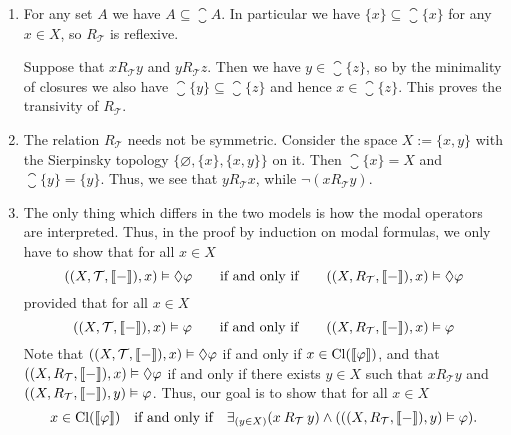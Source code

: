 \documentclass{article}
\newcommand{\topology}{{\mathcal{T}}}
\begin{document}
\maketitle

\begin{ex}
\end{ex}

\begin{ex}
\begin{enumerate}
\item For any set $A$ we have $A\subseteq\closure{A}$. In particular we have
$\{x\}\subseteq\closure{\{x\}}$ for any $x\in X$, so $R_\topology$ is reflexive.

Suppose that $x\mathbin{R_\topology} y$ and $y\mathbin{R_\topology} z$. Then
we have $y\in\closure{\{z\}}$, so by the minimality of closures we also have
$\closure{\{y\}}\subseteq\closure{\{z\}}$ and hence $x\in\closure{\{z\}}$. This
proves the transivity of $R_\topology$.
\item The relation $R_\topology$ needs not be symmetric. Consider the space
$X:=\{x,y\}$ with the Sierpinsky topology $\{\varnothing,\{x\},\{x,y\}\}$ on it.
Then $\closure{\{x\}}=X$ and $\closure{\{y\}}=\{y\}$. Thus, we see that
$y\mathbin{R_\topology} x$, while $\neg(x\mathbin{R_\topology}y)$. 
\item The only thing which differs in the two models is how the modal operators
are interpreted. Thus, in the proof by induction on modal formulas, 
we only have to show that for all $x\in X$
\begin{equation*}
((X,\topology,\lsem{-}\rsem),x)\models\pos\varphi
  \qquad
  \text{if and only if}
  \qquad
((X,R_\topology,\lsem{-}\rsem),x)\models\pos\varphi
\end{equation*}
provided that for all $x\in X$
\begin{equation*}
((X,\topology,\lsem{-}\rsem),x)\models\varphi
  \qquad
  \text{if and only if}
  \qquad
((X,R_\topology,\lsem{-}\rsem),x)\models\varphi
\end{equation*}
Note that $((X,\topology,\lsem{-}\rsem),x)\models\pos\varphi$ if and only if
$x\in\mathrm{Cl}(\llbracket\varphi\rrbracket)$, and that
$((X,R_\topology,\lsem{-}\rsem),x)\models\pos\varphi$ if and only if
there exists $y\in X$ such that $x\mathbin{R_\topology}y$ and
$((X,R_\topology,\lsem{-}\rsem),y)\models\varphi$. Thus, our goal is to show
that for all $x\in X$
\begin{equation*}
x\in\closure{\lsem\varphi\rsem}
  \quad
  \text{if and only if}
  \quad
\exists_{(y\in X)}(x\mathbin{R_\topology}y)\land (((X,R_\topology,\lsem{-}\rsem),y)\models\varphi).
\end{equation*}


\end{enumerate}
\end{ex}
\end{document}
